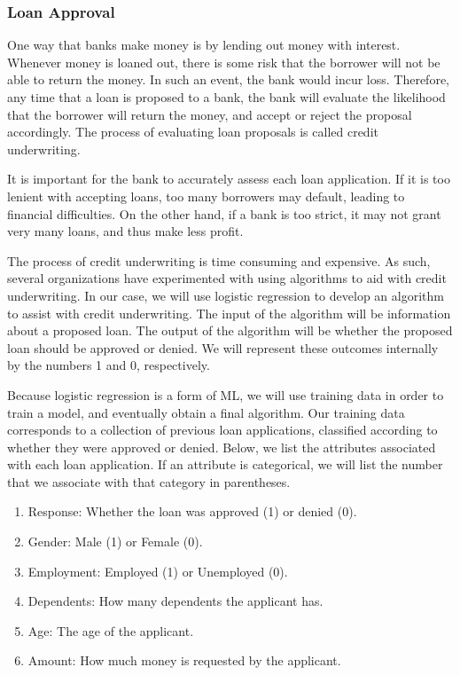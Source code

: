 \subsubsection{Loan Approval}
\par One way that banks make money is by lending out money with interest. Whenever money is loaned out, there is some risk that the borrower will not be able to return the money. In such an event, the bank would incur loss. Therefore, any time that a loan is proposed to a bank, the bank will evaluate the likelihood that the borrower will return the money, and accept or reject the proposal accordingly. The process of evaluating loan proposals is called credit underwriting.
\par It is important for the bank to accurately assess each loan application. If it is too lenient with accepting loans, too many borrowers may default, leading to financial difficulties. On the other hand, if a bank is too strict, it may not grant very many loans, and thus make less profit.
\par The process of credit underwriting is time consuming and expensive. As such, several organizations have experimented with using algorithms to aid with credit underwriting. In our case, we will use logistic regression to develop an algorithm to assist with credit underwriting. The input of the algorithm will be information about a proposed loan. The output of the algorithm will be whether the proposed loan should be approved or denied. We will represent these outcomes internally by the numbers 1 and 0, respectively.
\par Because logistic regression is a form of ML, we will use training data in order to train a model, and eventually obtain a final algorithm. Our training data corresponds to a collection of previous loan applications, classified according to whether they were approved or denied. Below, we list the attributes associated with each loan application. If an attribute is categorical, we will list the number that we associate with that category in parentheses.
\begin{enumerate}
    \item Response: Whether the loan was approved (1) or denied (0).
    \item Gender: Male (1) or Female (0).
    \item Employment: Employed (1) or Unemployed (0).
    \item Dependents: How many dependents the applicant has.
    \item Age: The age of the applicant.
    \item Amount: How much money is requested by the applicant.
\end{enumerate}

